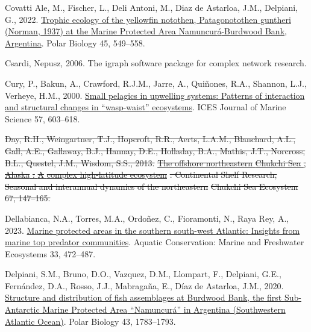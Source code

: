 \documentclass[
]{article}
\newlength{\cslhangindent}
\newenvironment{CSLReferences}[2] %
 {\begin{list}{}{%
  \setlength{\itemindent}{0pt}
  \setlength{\leftmargin}{0pt}
  \setlength{\parsep}{0pt}
  \ifodd #1
   \setlength{\leftmargin}{\cslhangindent}
   \setlength{\itemindent}{-1\cslhangindent}
  \fi
  \setlength{\itemsep}{#2\baselineskip}}}
 {\end{list}}
\providecommand{\DIFdel}[1]{{\protect\color{red}\sout{#1}}}                      %
\providecommand{\DIFdelbegin}{} %
\providecommand{\DIFdelend}{} %
\newcommand{\DIFscaledelfig}{0.5}
\newlength{\DIFdelgraphicswidth} %
\newlength{\DIFdelgraphicsheight} %
\newcommand{\DIFdelincludegraphics}[2][]{%
\sbox{\DIFdelgraphicsbox}{\DIFOincludegraphics[#1]{#2}}%
\settoboxwidth{\DIFdelgraphicswidth}{\DIFdelgraphicsbox} %
\settoboxtotalheight{\DIFdelgraphicsheight}{\DIFdelgraphicsbox} %
\scalebox{\DIFscaledelfig}{%
\parbox[b]{\DIFdelgraphicswidth}{\usebox{\DIFdelgraphicsbox}\\[-\baselineskip] \rule{\DIFdelgraphicswidth}{0em}}\llap{\resizebox{\DIFdelgraphicswidth}{\DIFdelgraphicsheight}{%
\setlength{\unitlength}{\DIFdelgraphicswidth}%
\begin{picture}(1,1)%
\thicklines\linethickness{2pt} %
{\color[rgb]{1,0,0}\put(0,0){\framebox(1,1){}}}%
{\color[rgb]{1,0,0}\put(0,0){\line( 1,1){1}}}%
{\color[rgb]{1,0,0}\put(0,1){\line(1,-1){1}}}%
\end{picture}%
}\hspace*{3pt}}} %
} %
\DeclareRobustCommand{\DIFdelbegin}{\DIFOdelbegin \let\includegraphics\DIFdelincludegraphics} %
\DeclareRobustCommand{\DIFdelend}{\DIFOaddend \let\includegraphics\DIFOincludegraphics} %
\begin{document}
\begin{CSLReferences}{1}{0}
Covatti Ale, M., Fischer, L., Deli Antoni, M., Diaz de Astarloa, J.M.,
Delpiani, G., 2022.
\href{https://doi.org/10.1007/s00300-022-03011-w}{Trophic ecology of the
yellowfin notothen, {Patagonotothen} guntheri ({Norman}, 1937) at the
{Marine Protected Area Namuncur{á}-Burdwood Bank}, {Argentina}}. Polar
Biology 45, 549--558.

Csardi, Nepusz, 2006. The igraph software package for complex network
research.

Cury, P., Bakun, A., Crawford, R.J.M., Jarre, A., Quiñones, R.A.,
Shannon, L.J., Verheye, H.M., 2000.
\href{https://doi.org/10.1006/jmsc.2000.0712}{Small pelagics in
upwelling systems: Patterns of interaction and structural changes in
{``wasp-waist''} ecosystems}. ICES Journal of Marine Science 57,
603--618.

\DIFdelbegin {}
\DIFdel{Day, R.H., Weingartner, T.J., Hopcroft, R.R., Aerts, L.A.M., Blanchard,
A.L., Gall, A.E., Gallaway, B.J., Hannay, D.E., Holladay, B.A., Mathis,
J.T., Norcross, B.L., Questel, J.M., Wisdom, S.S., 2013.
}\href{https://doi.org/10.1016/j.csr.2013.02.002}{\DIFdel{The offshore
northeastern }%
\DIFdel{Chukchi Sea}%
\DIFdel{, }%
\DIFdel{Alaska}%
\DIFdel{: }%
\DIFdel{A}%
\DIFdel{complex high-latitude
ecosystem}}%
\DIFdel{. Continental Shelf Research, Seasonal and interannual
dynamics of the northeastern }%
\DIFdel{Chukchi Sea Ecosystem}%
\DIFdel{67, 147--165.
}%

\DIFdelend {}
Dellabianca, N.A., Torres, M.A., Ordoñez, C., Fioramonti, N., Raya Rey,
A., 2023. \href{https://doi.org/10.1002/aqc.3935}{Marine protected areas
in the southern south-west {Atlantic}: {Insights} from marine top
predator communities}. Aquatic Conservation: Marine and Freshwater
Ecosystems 33, 472--487.

Delpiani, S.M., Bruno, D.O., Vazquez, D.M., Llompart, F., Delpiani,
G.E., Fernández, D.A., Rosso, J.J., Mabragaña, E., Díaz de Astarloa,
J.M., 2020. \href{https://doi.org/10.1007/s00300-020-02744-w}{Structure
and distribution of fish assemblages at {Burdwood Bank}, the first
{Sub-Antarctic Marine Protected Area} {``{Namuncur{á}}''} in {Argentina}
({Southwestern Atlantic Ocean})}. Polar Biology 43, 1783--1793.


\end{CSLReferences}
\end{document}
